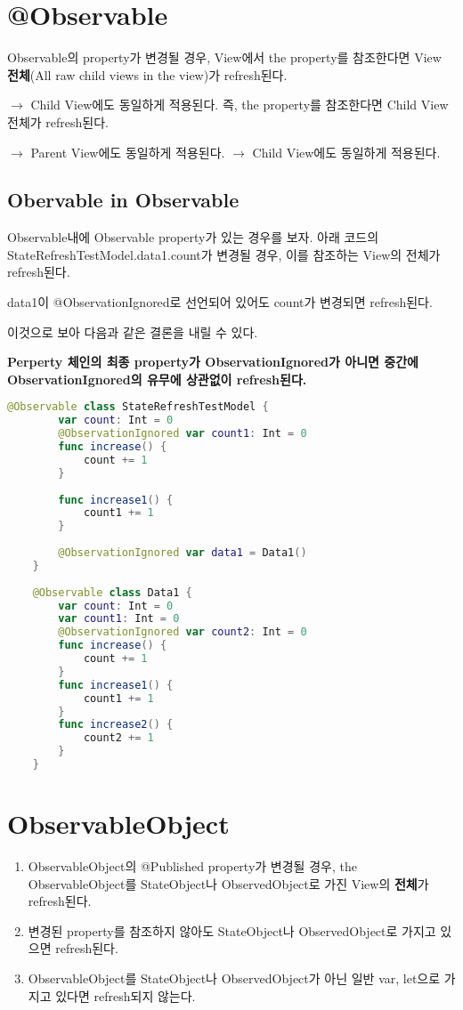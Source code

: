 \documentclass{article}
\begin{document}
   
\section{@Observable}
Observable의 property가 변경될 경우, View에서 the property를 참조한다면 View \textbf{전체}(All raw child views in the view)가 refresh된다.

$\rightarrow$ Child View에도 동일하게 적용된다. 즉, the property를 참조한다면 Child View 전체가 refresh된다.

$\rightarrow$ Parent View에도 동일하게 적용된다. $\rightarrow$ Child View에도 동일하게 적용된다.

\subsection{Obervable in Observable}
Observable내에 Observable property가 있는 경우를 보자.
아래 코드의 StateRefreshTestModel.data1.count가 변경될 경우, 이를 참조하는 View의 전체가 refresh된다.

data1이 @ObservationIgnored로 선언되어 있어도 count가 변경되면 refresh된다.

이것으로 보아 다음과 같은 결론을 내릴 수 있다.

\textbf{Perperty 체인의 최종 property가 ObservationIgnored가 아니면 중간에 ObservationIgnored의 유무에 상관없이 refresh된다.}

\begin{lstlisting}[language=Swift]
    @Observable class StateRefreshTestModel {
        var count: Int = 0
        @ObservationIgnored var count1: Int = 0
        func increase() {
            count += 1
        }
        
        func increase1() {
            count1 += 1
        }
        
        @ObservationIgnored var data1 = Data1()
    }
    
    @Observable class Data1 {
        var count: Int = 0
        var count1: Int = 0
        @ObservationIgnored var count2: Int = 0
        func increase() {
            count += 1
        }
        func increase1() {
            count1 += 1
        }
        func increase2() {
            count2 += 1
        }
    }
\end{lstlisting}


\section{ObservableObject}
\begin{enumerate}
\item ObservableObject의 @Published property가 변경될 경우, the ObservableObject를 StateObject나 ObservedObject로 가진 View의 \textbf{전체}가 refresh된다.
\item 변경된 property를 참조하지 않아도 StateObject나 ObservedObject로 가지고 있으면 refresh된다.
\item ObservableObject를 StateObject나 ObservedObject가 아닌 일반 var, let으로 가지고 있다면 refresh되지 않는다.
\end{enumerate}
\end{document}
